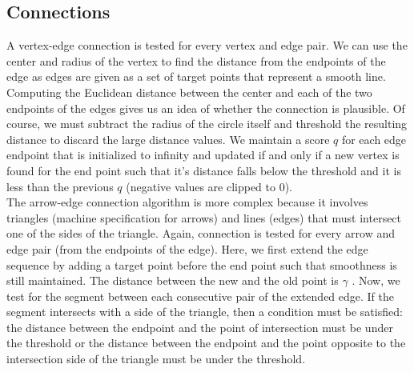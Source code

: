 \subsection{Connections}

A vertex-edge connection is tested for every vertex and edge pair. We can use the center and radius of the vertex to find the distance from the endpoints of the edge as edges are given as a set of target points that represent a smooth line. Computing the Euclidean distance between the center and each of the two endpoints of the edges gives us an idea of whether the connection is plausible. Of course, we must subtract the radius of the circle itself and threshold the resulting distance to discard the large distance values. We maintain a score $q$ for each edge endpoint that is initialized to infinity and updated if and only if a new vertex is found for the end point such that it's distance falls below the threshold and it is less than the previous $q$ (negative values are clipped to 0).\\

The arrow-edge connection algorithm is more complex because it involves triangles (machine specification for arrows) and lines (edges) that must intersect one of the sides of the triangle. Again, connection is tested for every arrow and edge pair (from the endpoints of the edge). Here, we first extend the edge sequence by adding a target point before the end point such that smoothness is still maintained. The distance between the new and the old point is $\gamma$ . Now, we test for the segment between each consecutive pair of the extended edge. If the segment intersects with a side of the triangle, then a condition must be satisfied: the distance between the endpoint and the point of intersection must be under the threshold or the distance between the endpoint and the point opposite to the intersection side of the triangle must be under the threshold.\\

